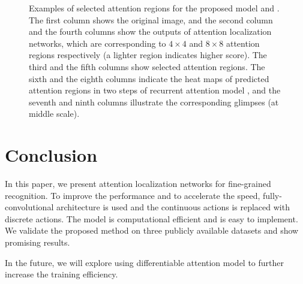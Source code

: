 \documentclass[10pt,twocolumn,letterpaper]{article}
\begin{document}
\begin{figure}[!t]
\caption{Examples of selected attention regions for the proposed model and  \cite{bd3}.
The first column shows the original image, and the second column and the fourth columns show the outputs of attention localization networks, which are corresponding to $4\times4$ and $8\times8$ attention regions respectively (a lighter region indicates higher score).
The third and the fifth columns show selected attention regions.
The sixth and the eighth columns indicate the heat maps of predicted attention regions in two steps of recurrent attention model \cite{bd3}, and the seventh and ninth columns illustrate the corresponding glimpses (at middle scale).
}\label{fig:attention_illustration}
\end{figure}

\section{Conclusion}
In this paper, we present attention localization networks for fine-grained recognition.
To improve the performance and to accelerate the speed, fully-convolutional architecture is used and the continuous actions is replaced with discrete actions.
The model is computational efficient and is easy to implement.
We validate the proposed method on three publicly available datasets and show promising results.

In the future, we will explore using differentiable attention model to further increase the training efficiency.




\end{document}
